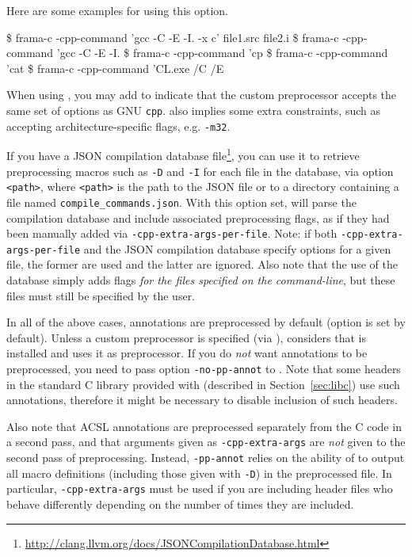 Here are some examples for using this option.
\begin{frama-c-commands}
\$ frama-c -cpp-command 'gcc -C -E -I. -x c' file1.src file2.i
\$ frama-c -cpp-command 'gcc -C -E -I. %
\$ frama-c -cpp-command 'cp %
\$ frama-c -cpp-command 'cat %
\$ frama-c -cpp-command 'CL.exe /C /E %
\end{frama-c-commands}

When using , you may add 
to indicate that the custom preprocessor accepts the same set of options as GNU
\texttt{cpp}.
 also implies some extra
constraints, such as accepting architecture-specific flags, e.g. \texttt{-m32}.

If you have a JSON compilation database file\footnote{%
  \url{http://clang.llvm.org/docs/JSONCompilationDatabase.html}}, you can use
it to retrieve preprocessing macros such as \texttt{-D} and \texttt{-I}
for each file in the database, via option
 \texttt{<path>}, where \texttt{<path>}
is the path to the JSON file or to a directory containing a
file named \texttt{compile\_commands.json}. With this option set,
\FramaC will parse
the compilation database and include associated preprocessing flags,
as if they had been manually added via \texttt{-cpp-extra-args-per-file}.
Note: if both \texttt{-cpp-extra-args-per-file} and the JSON compilation
database specify options for a given file, the former are used and the latter
are ignored. Also note that the use of the database simply adds flags
{\em for the files specified on the command-line}, but these files must still
be specified by the user.

In all of the above cases,
\acsl annotations are preprocessed by default (option 
is set by default). Unless a custom preprocessor is specified
(via ), \FramaC considers that \gcc is
installed and uses it as preprocessor.
If you do \emph{not} want annotations to be preprocessed, you need to pass
option \texttt{-no-pp-annot} to \FramaC. Note that some headers in the
standard C library provided with \FramaC (described in Section~\ref{sec:libc})
use such annotations,
therefore it might be necessary to disable inclusion of such headers.

Also note that ACSL annotations are preprocessed separately from the C
code in a second pass, and that arguments given as \texttt{-cpp-extra-args} are
\emph{not} given to the second pass of preprocessing. Instead,
\texttt{-pp-annot} relies on the ability of \gcc to output all
macro definitions (including those given with \texttt{-D}) in the
preprocessed file. In particular, \texttt{-cpp-extra-args} must be
used if you are including header files who behave differently
depending on the number of times they are included.

